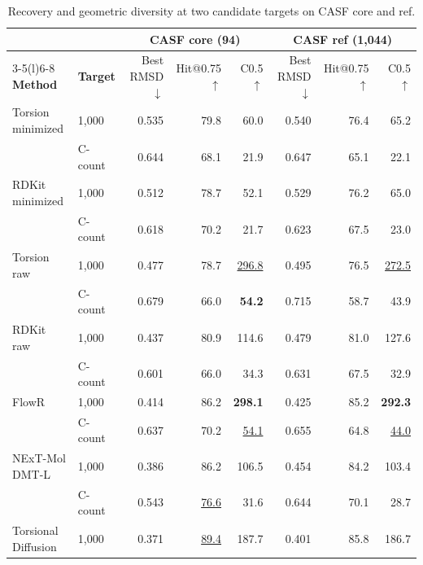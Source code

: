 \begin{table}[htbp]
\centering\footnotesize
\setlength{\tabcolsep}{2pt}
\renewcommand{\arraystretch}{1.35}
\caption{Recovery and geometric diversity at two candidate targets on CASF core and ref.}
\label{tab:recovery}
\par\smallskip
\begin{tabular*}{\linewidth}{@{\extracolsep{\fill}}llrrr@{\hspace{8pt}}rrr@{}}
\toprule
 & & \multicolumn{3}{c}{\textbf{CASF core (94)}} & \multicolumn{3}{c}{\textbf{CASF ref (1,044)}} \\
\cmidrule(lr){3-5}\cmidrule(l){6-8}
\textbf{Method} & \textbf{Target} & Best RMSD $\downarrow$ & Hit@0.75 $\uparrow$ & C0.5 $\uparrow$ & Best RMSD $\downarrow$ & Hit@0.75 $\uparrow$ & C0.5 $\uparrow$ \\
\midrule
\rowcolor{tableShade}
Torsion minimized & 1,000 & 0.535 & 79.8 & 60.0 & 0.540 & 76.4 & 65.2 \\
\rowcolor{tableShade}
 & C-count & 0.644 & 68.1 & 21.9 & 0.647 & 65.1 & 22.1 \\
\addlinespace[2pt]
RDKit minimized & 1,000 & 0.512 & 78.7 & 52.1 & 0.529 & 76.2 & 65.0 \\
 & C-count & 0.618 & 70.2 & 21.7 & 0.623 & 67.5 & 23.0 \\
\addlinespace[2pt]
\rowcolor{tableShade}
Torsion raw & 1,000 & 0.477 & 78.7 & \underline{296.8} & 0.495 & 76.5 & \underline{272.5} \\
\rowcolor{tableShade}
 & C-count & 0.679 & 66.0 & \textbf{54.2} & 0.715 & 58.7 & 43.9 \\
\addlinespace[2pt]
RDKit raw & 1,000 & 0.437 & 80.9 & 114.6 & 0.479 & 81.0 & 127.6 \\
 & C-count & 0.601 & 66.0 & 34.3 & 0.631 & 67.5 & 32.9 \\
\addlinespace[2pt]
\rowcolor{tableShade}
FlowR & 1,000 & 0.414 & 86.2 & \textbf{298.1} & 0.425 & 85.2 & \textbf{292.3} \\
\rowcolor{tableShade}
 & C-count & 0.637 & 70.2 & \underline{54.1} & 0.655 & 64.8 & \underline{44.0} \\
\addlinespace[2pt]
NExT-Mol DMT-L & 1,000 & 0.386 & 86.2 & 106.5 & 0.454 & 84.2 & 103.4 \\
 & C-count & 0.543 & \underline{76.6} & 31.6 & 0.644 & 70.1 & 28.7 \\
\addlinespace[2pt]
\rowcolor{tableShade}
Torsional Diffusion & 1,000 & 0.371 & \underline{89.4} & 187.7 & 0.401 & 85.8 & 186.7 \\

\end{tabular*}
\end{table}
